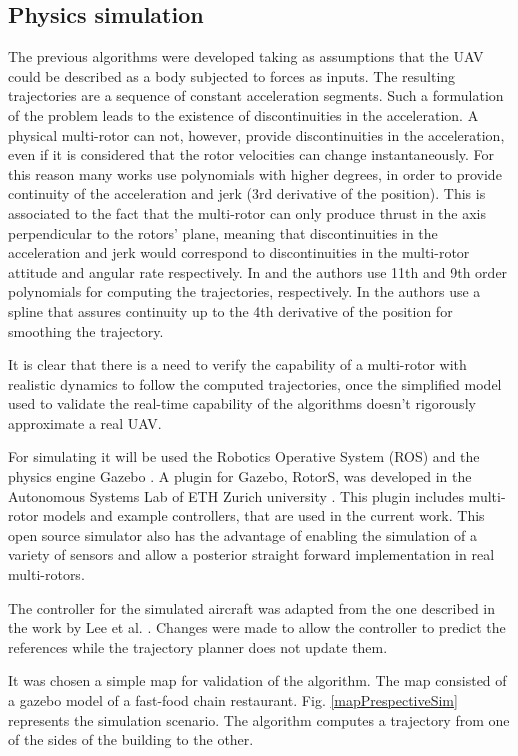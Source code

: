 \subsection{Physics simulation}
The previous algorithms were developed taking as assumptions that the UAV could be described as a body subjected to forces as inputs. The resulting trajectories are a sequence of constant acceleration segments. Such a formulation of the problem leads to the existence of discontinuities in the acceleration. A physical multi-rotor can not, however, provide discontinuities in the acceleration, even if it is considered that the rotor velocities can change instantaneously. For this reason many works use polynomials with higher degrees, in order to provide continuity of the acceleration and jerk (3rd derivative of the position).   This is associated to the fact that the multi-rotor can only produce thrust in the axis perpendicular to the rotors’ plane, meaning that discontinuities in the acceleration and jerk would correspond to discontinuities in the multi-rotor attitude and angular rate respectively.  In \cite{ETH} and \cite{agressive} the authors use 11th and 9th order polynomials for computing the trajectories, respectively. In \cite{ref:quad} the authors use a spline that assures continuity up to the 4th derivative of the position for smoothing the trajectory.
\par
It is clear that there is a need to verify the capability of a multi-rotor with realistic dynamics to follow the computed trajectories, once the simplified model used to validate the real-time capability of the algorithms doesn't rigorously approximate a real UAV.
\par
For simulating it will be used the Robotics Operative System (ROS) \cite{ref:ROS} and the physics engine Gazebo \cite{ref:Gazebo}. A plugin for Gazebo, RotorS, was developed in the Autonomous Systems Lab of ETH Zurich university \cite{Furrer2016}. This plugin includes multi-rotor models and example controllers, that are used in the current work. This open source simulator also has the advantage of enabling the simulation of a variety of sensors and allow a posterior straight forward  implementation in real multi-rotors.
\par
The controller for the simulated aircraft was adapted from the one described in the work by Lee et al. \cite{Lee}. Changes were made to allow the controller to predict the references while the trajectory planner does not update them.
\par
It was chosen a simple map for validation of the algorithm. The map consisted of a gazebo model of a fast-food chain restaurant. Fig. \ref{mapPrespectiveSim} represents the simulation scenario. The algorithm computes a trajectory from one of the sides of the building to the other.

